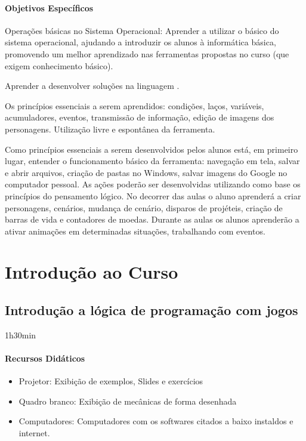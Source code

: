 \documentclass[letterpaper,10pt,brazil]{sphinxmanual}
\begin{document}
\subsubsection*{Objetivos Específicos}

\sphinxAtStartPar
Operações básicas no Sistema Operacional:
Aprender a utilizar o básico do sistema operacional, ajudando a introduzir os alunos à
informática básica, promovendo um melhor aprendizado nas ferramentas propostas
no curso (que exigem conhecimento básico).

\sphinxAtStartPar
Aprender a desenvolver soluções na linguagem  .

\sphinxAtStartPar
Os princípios essenciais a serem aprendidos: condições, laços, variáveis,
acumuladores, eventos, transmissão de informação, edição de imagens dos
personagens. Utilização livre e espontânea da ferramenta.

\sphinxAtStartPar
Como princípios essenciais a serem desenvolvidos pelos alunos está, em primeiro
lugar, entender o funcionamento básico da ferramenta: navegação em tela, salvar e
abrir arquivos, criação de pastas no Windows, salvar imagens do Google no
computador pessoal. As ações poderão ser desenvolvidas utilizando como base os
princípios do pensamento lógico. No decorrer das aulas o aluno aprenderá a criar
personagens, cenários, mudança de cenário, disparos de projéteis, criação de
barras de vida e contadores de moedas. Durante as aulas os alunos aprenderão a
ativar animações em determinadas situações, trabalhando com eventos.

\sphinxstepscope


\chapter{Introdução ao Curso}
\label{\detokenize{modelo_aula_01:introducao-ao-curso}}\label{\detokenize{modelo_aula_01::doc}}

\section{Introdução a lógica de programação com jogos}
\label{\detokenize{modelo_aula_01:introducao-a-logica-de-programacao-com-jogos}}
\sphinxAtStartPar
{} 1h30min
\subsubsection*{Recursos Didáticos}
\begin{itemize}
\item {} 
\sphinxAtStartPar
Projetor: Exibição de exemplos, Slides e exercícios

\item {} 
\sphinxAtStartPar
Quadro branco: Exibição de mecânicas de forma desenhada

\item {} 
\sphinxAtStartPar
Computadores: Computadores com os softwares citados a baixo instaldos e internet.

\end{itemize}
\end{document}
